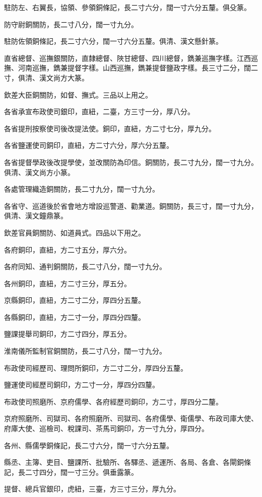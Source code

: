 \begin{pinyinscope}
駐防左、右翼長，協領、參領銅條記，長二寸六分，闊一寸六分五釐。俱殳篆。

防守尉銅關防，長二寸八分，闊一寸九分。

駐防佐領銅條記，長二寸六分，闊一寸六分五釐。俱清、漢文懸針篆。

直省總督、巡撫銀關防，直隸總督、陜甘總督、四川總督，鐫兼巡撫字樣。江西巡撫、河南巡撫，鐫兼提督字樣。山西巡撫，鐫兼提督鹽政字樣。長三寸二分，闊二寸，俱清、漢文尚方大篆。

欽差大臣銅關防，如督、撫式。三品以上用之。

各省承宣布政使司銀印，直紐，二臺，方三寸一分，厚八分。

各省提刑按察使司後改提法使。銅印，直紐，方二寸七分，厚九分。

各省鹽運使司銅印，直紐，方二寸六分，厚六分五釐。

各省提督學政後改提學使，並改關防為印信。銅關防，長二寸九分，闊一寸九分。俱清、漢文尚方小篆。

各處管理織造銅關防，長二寸九分，闊一寸九分。

各省守、巡道後於省會地方增設巡警道、勸業道。銅關防，長三寸，闊一寸九分，俱清、漢文鐘鼎篆。

欽差官員銅關防、如道員式。四品以下用之。

各府銅印，直紐，方二寸五分，厚六分。

各府同知、通判銅關防，長二寸八分，闊一寸九分。

各州銅印，直紐，方二寸三分，厚五分。

京縣銅印，直紐，方二寸二分，厚四分五釐。

各縣銅印，直紐，方二寸一分，厚四分四釐。

鹽課提舉司銅印，方二寸四分，厚五分。

淮南儀所監制官銅關防，長二寸八分，闊一寸九分。

布政使司經歷司、理問所銅印，方二寸二分，厚四分五釐。

鹽運使司經歷司銅印，方二寸一分，厚四分四釐。

布政使司照磨所、京府儒學、各府經歷司銅印，方二寸，厚四分二釐。

京府照磨所、司獄司、各府照磨所、司獄司、各府儒學、衛儒學、布政司庫大使、府庫大使、巡檢司、稅課司、茶馬司銅印，方一寸九分，厚四分。

各州、縣儒學銅條記，長二寸六分，闊一寸六分五釐。

縣丞、主簿、吏目、鹽課所、批驗所、各驛丞、遞運所、各局、各倉、各閘銅條記，長二寸四分，闊一寸三分。俱垂露篆。

提督、總兵官銀印，虎紐，三臺，方三寸三分，厚九分。


\end{pinyinscope}
